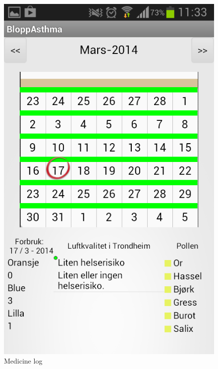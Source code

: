 \begin{figure}
\begin{minipage}[t]{0.4\linewidth}
			\includegraphics[width=0.20\paperwidth]{Pictures/new-screenshots/log.png}
		\caption{Medicine log}
		\label{fig:medicine-log}
	\end{minipage}
	\hspace{3cm}
		\begin{minipage}[t]{0.4\linewidth}
		\centering

\end{minipage}
\end{figure}
